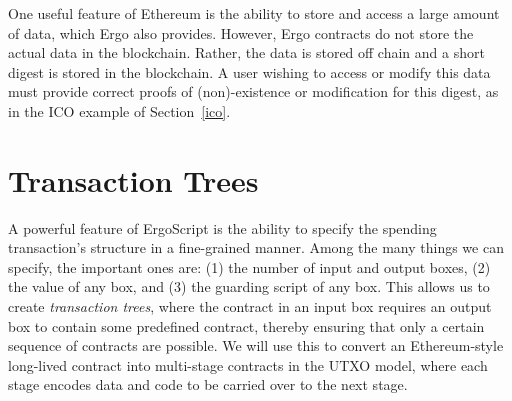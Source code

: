 \documentclass[runningheads]{llncs}
\newcommand{\langname}{ErgoScript\xspace}
\begin{document}
 
 One useful feature of Ethereum is the ability to store and access a large amount of data, which Ergo also provides.
 However, Ergo contracts do not store the actual data in the blockchain. Rather, the data is stored off chain and a short digest is stored in the blockchain. A user wishing to access or modify this data must provide correct proofs of (non)-existence or modification for this digest, as in the ICO example of Section~\ref{ico}. 

\section{Transaction Trees}

A powerful feature of \langname is the ability to specify the spending transaction's structure in a fine-grained manner. 
Among the many things we can specify, the important ones are: (1) the number of input and output boxes, (2) the value of any box, and (3) the guarding script of any box. This allows us to create {\em transaction trees}, where the contract in an input box requires an output box to contain some predefined contract, thereby ensuring that only a certain sequence of contracts are possible. 
We will use this to convert an Ethereum-style long-lived contract into multi-stage contracts in the UTXO model, where each stage encodes data and code to be carried over to the next stage. 
\end{document}
